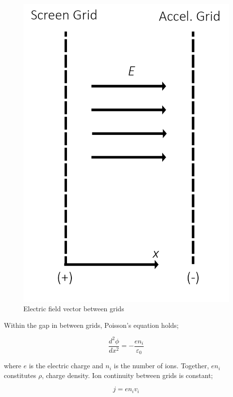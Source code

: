 \begin{figure}[ht]
    \centering
    \includegraphics[scale=0.3]{fig/gridpot.png}
    \caption{Electric field vector between grids}
    \label{fig:gridpot}
\end{figure}
\newpage

Within the gap in between grids, Poisson's equation holds\cite{OCW1964};

\begin{equation}
    \frac{d^2\phi}{dx^2} = -\frac{e n_i}{\varepsilon_0}
    \label{eq:poisson}
\end{equation}

where $e$ is the electric charge and $n_i$ is the number of ions. Together, $e n_i$ constitutes $\rho$, charge density. Ion continuity between grids is constant;

\begin{equation}
    j = e n_i v_i
    \label{eq:ioncont}
\end{equation}

